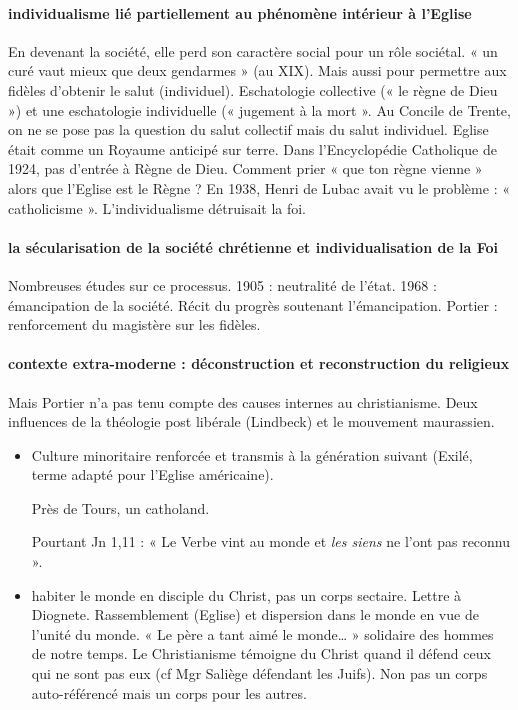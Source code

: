 \paragraph{individualisme lié partiellement au phénomène intérieur à l’Eglise} En devenant la société, elle perd son caractère social pour un rôle sociétal. « un curé vaut mieux que deux gendarmes » (au XIX). Mais aussi pour permettre aux fidèles d’obtenir le salut (individuel). Eschatologie collective (« le règne de Dieu ») et une eschatologie individuelle (« jugement à la mort ».
Au Concile de Trente, on ne se pose pas la question du salut collectif mais du salut individuel. Eglise était comme un Royaume anticipé sur terre. Dans l’Encyclopédie Catholique de 1924, pas d’entrée à Règne de Dieu. Comment prier « que ton règne vienne » alors que l’Eglise est le Règne ? 
En 1938, Henri de Lubac avait vu le problème : « catholicisme ». L’individualisme détruisait la foi. 

\paragraph{la sécularisation de la société chrétienne et individualisation de la Foi} Nombreuses études sur ce processus. 1905 : neutralité de l’état. 1968 : émancipation de la société. Récit du progrès soutenant l’émancipation. Portier : renforcement du magistère sur les fidèles.

\paragraph{contexte extra-moderne : déconstruction et reconstruction du religieux}  Mais Portier n’a pas tenu compte des causes internes au christianisme. Deux influences de la théologie post libérale (Lindbeck) et le mouvement maurassien. 
\begin{itemize}
\item 
Culture minoritaire renforcée et transmis à la génération suivant (Exilé, terme adapté pour l’Eglise américaine). 
\begin{Ex}
Près de Tours, un catholand.
\end{Ex}
Pourtant Jn 1,11 : « Le Verbe vint au monde et \textit{les siens} ne l’ont pas reconnu ». 
\item habiter le monde en disciple du Christ, pas un corps sectaire. Lettre à Diognete. Rassemblement (Eglise) et dispersion dans le monde en vue de l’unité du monde. 
« Le père a tant aimé le monde… » solidaire des hommes de notre temps.  Le Christianisme témoigne du Christ quand il défend ceux qui ne sont pas eux (cf Mgr Saliège défendant les Juifs).  Non pas un corps auto-référencé mais un corps pour les autres. 
\end{itemize}

